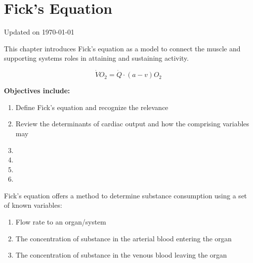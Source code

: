 \chapter{Fick's Equation}\label{chp:fick_equation}
Updated on \today
\minitoc


This chapter introduces Fick's equation as a model to connect the muscle and supporting systems roles in attaining and sustaining activity.

\begin{equation}
    \dot{V}O_2 = \dot{Q} \cdot (a-v)O_2
\end{equation}



\vspace{5mm}

\textbf{Objectives include:}
\begin{enumerate}
    \item Define Fick's equation and recognize the relevance 
    \item Review the determinants of cardiac output and how the comprising variables may 
    \item
    \item
    \item
    \item
\end{enumerate}


Fick's equation offers a method to determine substance consumption using a set of known variables: 

\begin{enumerate}
    \item Flow rate to an organ/system
    \item The concentration of substance in the arterial blood entering the organ
    \item The concentration  of substance in the venous blood leaving the organ
\end{enumerate}

